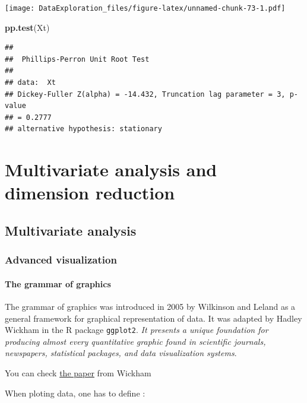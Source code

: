 \documentclass[
]{book}
\newenvironment{Shaded}{\begin{snugshade}}{\end{snugshade}}
\newcommand{\KeywordTok}[1]{\textcolor[rgb]{0.13,0.29,0.53}{\textbf{#1}}}
\newcommand{\NormalTok}[1]{#1}
\begin{document}
\texttt{[image: DataExploration\_files/figure-latex/unnamed-chunk-73-1.pdf]}

\begin{Shaded}
\begin{Highlighting}[]
\KeywordTok{pp.test}\NormalTok{(Xt)}
\end{Highlighting}
\end{Shaded}

\begin{verbatim}
## 
## 	Phillips-Perron Unit Root Test
## 
## data:  Xt
## Dickey-Fuller Z(alpha) = -14.432, Truncation lag parameter = 3, p-value
## = 0.2777
## alternative hypothesis: stationary
\end{verbatim}

\hypertarget{multivar}{%
\chapter{Multivariate analysis and dimension reduction}\label{multivar}}

\hypertarget{multivariate-analysis}{%
\section{Multivariate analysis}\label{multivariate-analysis}}

\hypertarget{advanced-visualization}{%
\subsection{Advanced visualization}\label{advanced-visualization}}

\hypertarget{the-grammar-of-graphics}{%
\subsubsection{The grammar of graphics}\label{the-grammar-of-graphics}}

The grammar of graphics was introduced in 2005 by Wilkinson and Leland as a general framework for graphical representation of data. It was adapted by Hadley Wickham in the R package \texttt{ggplot2}.
\emph{It presents a unique foundation for producing almost every quantitative graphic found in scientific journals, newspapers, statistical packages, and data visualization systems}.

You can check \href{https://vita.had.co.nz/papers/layered-grammar.html}{the paper} from Wickham

When ploting data, one has to define :
\end{document}
